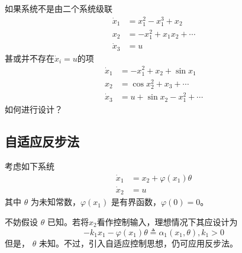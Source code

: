 \begin{problem}
如果系统不是由二个系统级联
    \begin{align*}
    \dot{x}_1 & = x^2_1 - x^3_1 + x_2\\
    x_2 & = - x^2_1 + x_1 x_2 + \cdots \\
    \dot{x}_3 & = u
  \end{align*}
  甚或并不存在$\dot{x}_i=u$的项
  \begin{align*}
    \dot{x}_1 & = -x_1^2+ x_2+\sin x_1\\
    x_2 & = \cos x_2^2 + x_3+ \cdots \\
    \dot{x}_3 & = u +\sin x_2 -x_1^2+ \cdots 
  \end{align*}
  如何进行设计？
\end{problem}

\subsection{自适应反步法}

考虑如下系统
\begin{equation}
    \begin{aligned}
  \dot{x}_1 & = x_2 + \varphi (x_1) \theta\\
  \dot{x}_2 & = u
\end{aligned}\label{Sys:adaptive_backstepping}
\end{equation}
其中 $\theta$ 为未知常数，$\varphi (x_1)$ 是有界函数，$\varphi (0) = 0$。

不妨假设 $\theta$ 已知。若将$x_2$看作控制输入，理想情况下其应设计为
\[- k_1 x_1 - \varphi (x_1) \theta \triangleq \alpha_1 (x_1,\theta), k_1 > 0
\]
但是， $\theta$ 未知。不过，引入自适应控制思想，仍可应用反步法。



